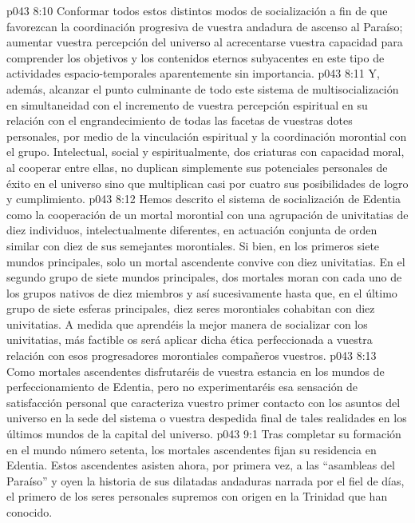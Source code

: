 \vs p043 8:10 Conformar todos estos distintos modos de socialización a fin de que favorezcan la coordinación progresiva de vuestra andadura de ascenso al Paraíso; aumentar vuestra percepción del universo al acrecentarse vuestra capacidad para comprender los objetivos y los contenidos eternos subyacentes en este tipo de actividades espacio\hyp{}temporales aparentemente sin importancia.
\vs p043 8:11 Y, además, alcanzar el punto culminante de todo este sistema de multisocialización en simultaneidad con el incremento de vuestra percepción espiritual en su relación con el engrandecimiento de todas las facetas de vuestras dotes personales, por medio de la vinculación espiritual y la coordinación morontial con el grupo. Intelectual, social y espiritualmente, dos criaturas con capacidad moral, al cooperar entre ellas, no duplican simplemente sus potenciales personales de éxito en el universo sino que multiplican casi por cuatro sus posibilidades de logro y cumplimiento.
\vs p043 8:12 \pc Hemos descrito el sistema de socialización de Edentia como la cooperación de un mortal morontial con una agrupación de univitatias de diez individuos, intelectualmente diferentes, en actuación conjunta de orden similar con diez de sus semejantes morontiales. Si bien, en los primeros siete mundos principales, solo un mortal ascendente convive con diez univitatias. En el segundo grupo de siete mundos principales, dos mortales moran con cada uno de los grupos nativos de diez miembros y así sucesivamente hasta que, en el último grupo de siete esferas principales, diez seres morontiales cohabitan con diez univitatias. A medida que aprendéis la mejor manera de socializar con los univitatias, más factible os será aplicar dicha ética perfeccionada a vuestra relación con esos progresadores morontiales compañeros vuestros.
\vs p043 8:13 Como mortales ascendentes disfrutaréis de vuestra estancia en los mundos de perfeccionamiento de Edentia, pero no experimentaréis esa sensación de satisfacción personal que caracteriza vuestro primer contacto con los asuntos del universo en la sede del sistema o vuestra despedida final de tales realidades en los últimos mundos de la capital del universo.
\vs p043 9:1 Tras completar su formación en el mundo número setenta, los mortales ascendentes fijan su residencia en Edentia. Estos ascendentes asisten ahora, por primera vez, a las “asambleas del Paraíso” y oyen la historia de sus dilatadas andaduras narrada por el fiel de días, el primero de los seres personales supremos con origen en la Trinidad que han conocido.
